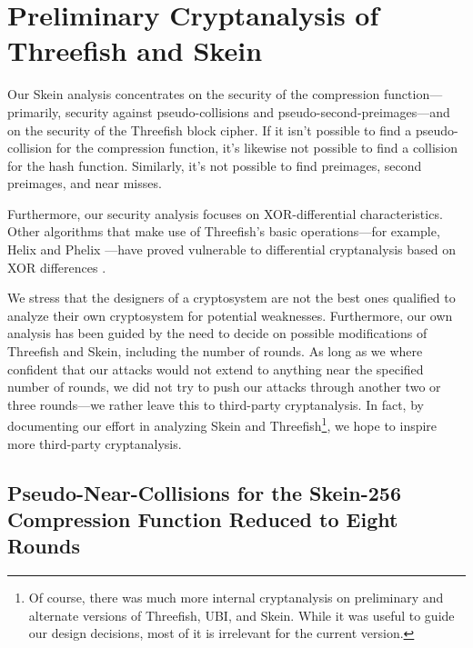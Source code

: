 \documentclass[11pt,twoside]{article}
\begin{document}
\section{Preliminary Cryptanalysis of Threefish and Skein}
  \label{sec:prelim-analysis}

Our Skein analysis concentrates on the security of the compression function---primarily, security against pseudo-collisions and pseudo-second-preimages---and on the security of the Threefish block cipher.  If it isn't possible to find a pseudo-collision for the compression function, it's likewise not possible to find a collision for the hash function.  Similarly, it's not possible to find preimages, second preimages, and near misses. 

Furthermore, our security analysis focuses on XOR-differential characteristics.  Other algorithms that make use of Threefish's basic operations---for example, Helix \cite{Helix} and Phelix \cite{Phelix}---have proved vulnerable to differential cryptanalysis based on XOR differences \cite{HA1,HA2,HA3,PA}.

We stress that the designers of a cryptosystem are not the best ones qualified to analyze their own cryptosystem for potential weaknesses. Furthermore, our own analysis has been guided by the need to decide on possible modifications of Threefish and Skein, including the number of rounds. As long as we where confident that our attacks would not extend to anything near the specified number of rounds, we did not try to push our attacks through another two or three rounds---we rather leave this to third-party cryptanalysis. In fact, by documenting our effort in analyzing Skein and Threefish\footnote{Of course, there was much more internal cryptanalysis on preliminary and alternate versions of Threefish, UBI, and Skein. While it was useful to guide our design decisions, most of it is irrelevant for the current version.}, we hope to inspire more third-party cryptanalysis.

\subsection{Pseudo-Near-Collisions for the Skein-256 Compression Function 
Reduced to Eight Rounds}
\end{document}
